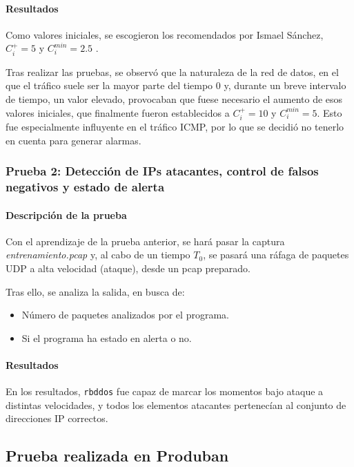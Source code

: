\paragraph{Resultados}\mbox{}

Como valores iniciales, se escogieron los recomendados por Ismael Sánchez, $C_i^+=5$ y $C_i^{min}=2.5$
 \cite{CUSUM_Carlos_III}.

Tras realizar las pruebas, se observó que la naturaleza de la red de datos, en el que el tráfico suele ser la 
mayor parte del tiempo $0$ y, durante un breve intervalo de tiempo, un valor elevado, provocaban que fuese necesario
el aumento de esos valores iniciales, que finalmente fueron establecidos a $C_i^+=10$ y $C_i^{min}=5$. Esto fue
especialmente influyente en el tráfico \gls{ICMP}, por lo que se decidió no tenerlo en cuenta para generar alarmas.

\subsubsection{Prueba 2: Detección de IPs atacantes, control de falsos negativos y estado de 
alerta}
\paragraph{Descripción de la prueba}\mbox{}

Con el aprendizaje de la prueba anterior, se hará pasar 
la captura \emph{entrenamiento.pcap} y, al cabo de un tiempo $T_0$, 
se pasará una ráfaga de paquetes UDP a alta velocidad (ataque), desde un pcap preparado.

Tras ello, se analiza la salida, en busca de:
\begin{itemize}
 \item Número de paquetes analizados por el programa.
 \item Si el programa ha estado en alerta o no.
\end{itemize}

\paragraph{Resultados}\mbox{}

En los resultados, \texttt{rbddos} fue capaz de marcar los momentos bajo ataque a distintas velocidades, y todos los 
elementos atacantes pertenecían al conjunto de direcciones IP correctos.

\subsection{Prueba realizada en Produban}
